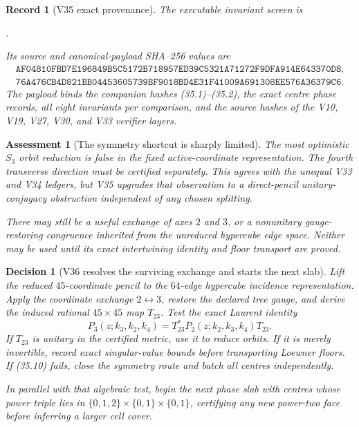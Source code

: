 \documentclass[11pt,oneside]{article}
\newtheorem{assessment}[theorem]{Assessment}
\newtheorem{record}[theorem]{Record}
\newtheorem{decision}[theorem]{Decision}
\theoremstyle{definition}
\theoremstyle{remark}
\begin{document}
\begin{record}[V35 exact provenance]
\label{rec:newv35-provenance}
The executable invariant screen is
\begin{center}
\footnotesize
{}.
\end{center}
Its source and canonical-payload SHA--256 values are
\[
\begin{gathered}
\texttt{AF04810FBD7E196849B5C5172B718957ED39C5321A71272F9DFA914E643370D8},\\
\texttt{76A476CB4D821BB04453605739BF9018BD4E31F41009A691308EE576A36379C6}.
\end{gathered}                                          \tag{35.9}
\]
The payload binds the companion hashes (35.1)--(35.2), the exact
centre phase records, all eight invariants per comparison, and the
source hashes of the V10, V19, V27, V30, and V33 verifier layers.
\end{record}

\begin{assessment}[The symmetry shortcut is sharply limited]
\label{ass:newv35}
The most optimistic \(S_3\) orbit reduction is false in the fixed
active-coordinate representation.  The fourth transverse direction
must be certified separately.  This agrees with the unequal V33 and
V34 ledgers, but V35 upgrades that observation to a direct-pencil
unitary-conjugacy obstruction independent of any chosen splitting.

There may still be a useful exchange of axes \(2\) and \(3\), or a
nonunitary gauge-restoring congruence inherited from the unreduced
hypercube edge space.  Neither may be used until its exact
intertwining identity and floor transport are proved.
\end{assessment}

\begin{decision}[V36 resolves the surviving exchange and starts the next slab]
\label{dec:newv35-next}
Lift the reduced \(45\)-coordinate pencil to the \(64\)-edge
hypercube incidence representation.  Apply the coordinate exchange
\(2\leftrightarrow3\), restore the declared tree gauge, and derive
the induced rational \(45\times45\) map \(T_{23}\).  Test the exact
Laurent identity
\[
 P_3(z;k_3,k_2,k_4)
 =T_{23}^*P_2(z;k_2,k_3,k_4)T_{23}.                    \tag{35.10}
\]
If \(T_{23}\) is unitary in the certified metric, use it to reduce
orbits.  If it is merely invertible, record exact singular-value
bounds before transporting Loewner floors.  If (35.10) fails,
close the symmetry route and batch all centres independently.

In parallel with that algebraic test, begin the next phase slab with
centres whose power triple lies in
\(\{0,1,2\}\times\{0,1\}\times\{0,1\}\), certifying any new
power-two face before inferring a larger cell cover.
\end{decision}
\end{document}
